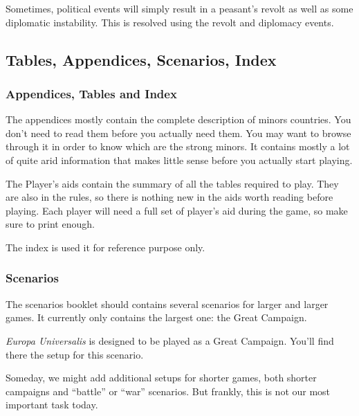 Sometimes, political events will simply result in a peasant's revolt as well
as some diplomatic instability. This is resolved using the revolt and
diplomacy events. 

\subsection*{Tables, Appendices, Scenarios, Index}
\subsubsection*{Appendices, Tables and Index}
The appendices mostly contain the complete description of minors
countries. You don't need to read them before you actually need them. You may
want to browse through it in order to know which are the strong minors. It
contains mostly a lot of quite arid information that makes little sense before
you actually start playing.

The Player's aids contain the summary of all the tables required to play. They
are also in the rules, so there is nothing new in the aids worth reading
before playing. Each player will need a full set of player's aid during the
game, so make sure to print enough.

The index is used it for reference purpose only.

\subsubsection*{Scenarios}
The scenarios booklet should contains several scenarios for larger and larger
games. It currently only contains the largest one: the Great Campaign.

\emph{Europa Universalis} is designed to be played as a Great Campaign. You'll
find there the setup for this scenario.

Someday, we might add additional setups for shorter games, both shorter
campaigns and ``battle'' or ``war'' scenarios. But frankly, this is not our
most important task today.

